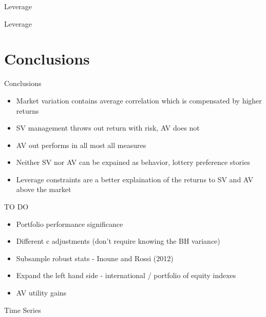 \documentclass{beamer}
\begin{document}
\begin{frame}{Leverage}
	\begin{adjustbox}{width=\textwidth,height=4cm}
		
	\end{adjustbox}
\end{frame}

\begin{frame}{Leverage}
	\begin{adjustbox}{width=\textwidth,height=4cm}
		
	\end{adjustbox}
\end{frame}

\section{Conclusions}
\begin{frame}{Conclusions}
\begin{itemize}[<+->]
\item Market variation contains average correlation which is compensated by higher returns
\item SV management throws out return with risk, AV does not
\item AV out performs in all most all measures
\item Neither SV nor AV can be expained as behavior, lottery preference stories
\item Leverage constraints are a better explaination of the returns to SV and AV above the market
\end{itemize}
\end{frame}

\begin{frame}{TO DO}
	\begin{itemize}
			\item Portfolio performance significance
			\item Different c adjustments (don't require knowing the BH variance)
			\item Subsample robust stats - Inoune and Rossi (2012)
			\item Expand the left hand side - international / portfolio of equity indexes
			\item AV utility gains
	\end{itemize}

\end{frame}

\begin{frame}{Time Series}
	\begin{adjustbox}{width=\textwidth}
			
	\end{adjustbox}
\end{frame}
\end{document}
